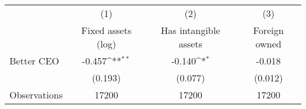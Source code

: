{
\def\sym#1{\ifmmode^{#1}\else\(^{#1}\)\fi}
\begin{tabular}{l*{3}{c}}
\hline\hline
                    &\multicolumn{1}{c}{(1)}&\multicolumn{1}{c}{(2)}&\multicolumn{1}{c}{(3)}\\
                    &\multicolumn{1}{c}{Fixed assets (log)}&\multicolumn{1}{c}{Has intangible assets}&\multicolumn{1}{c}{Foreign owned}\\
\hline
Better CEO          &      -0.457\sym{**} &      -0.140\sym{*}  &      -0.018         \\
                    &     (0.193)         &     (0.077)         &     (0.012)         \\
\hline
Observations        &       17200         &       17200         &       17200         \\
\hline\hline
\end{tabular}
}
